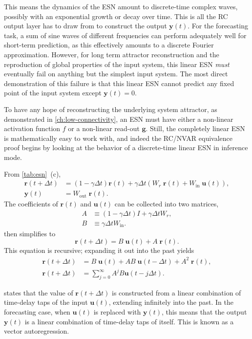 This means the dynamics of the ESN amount to discrete-time complex
waves, possibly with an exponential growth or decay over time. This is
all the RC output layer has to draw from to construct the output
$\bm{y}(t)$. For the forecasting task, a sum of sine waves of
different frequencies can perform adequately well for short-term
prediction, as this effectively amounts to a discrete Fourier
approximation. However, for long term attractor reconstruction and the
reproduction of global properties of the input system, this linear ESN
\emph{must} eventually fail on anything but the simplest input
system. The most direct demonstration of this failure is that this
linear ESN cannot predict any fixed point of the input system except
$\bm{y}(t) = 0$.

To have any hope of reconstructing the underlying system attractor, as
demonstrated in \cref{ch:low-connectivity}, an ESN must have either a
non-linear activation function $f$ or a non-linear read-out
$\bm{g}$. Still, the completely linear ESN is mathematically easy to
work with, and indeed the RC/NVAR equivalence proof begins by looking
at the behavior of a discrete-time linear ESN in inference mode.

From \cref{tab:esn}~(c),
\begin{align}
  \bm{r}(t + \Delta t) &= (1 - \gamma \Delta t) \bm{r}(t) + \gamma \Delta t \left( W_r\;\bm{r}(t) + W_\text{in}\;\bm{u}(t) \right), \label{eq:nvar-esn} \\
  \bm{y}(t) &= W_\text{out}\;\bm{r}(t).
\end{align}
The coefficients of $\bm{r}(t)$ and $\bm{u}(t)$ can be collected into two matrices,
\begin{align}
  A &\equiv (1 - \gamma \Delta t) I + \gamma \Delta t W_r, \\
  B &\equiv \gamma \Delta t W_\text{in}.
\end{align}
 then simplifies to
\begin{equation}
  \bm{r}(t + \Delta t) = B\;\bm{u}(t) + A\;\bm{r}(t).
\end{equation}
This equation is recursive; expanding it out into the past yields
\begin{align}
  \bm{r}(t + \Delta t) &= B\;\bm{u}(t) + AB\;\bm{u}(t - \Delta t) + A^2\;\bm{r}(t), \\
  \bm{r}(t + \Delta t) &= \sum_{j = 0}^\infty A^j B \bm{u}(t - j \Delta t). \label{eq:esn-var-mat}
\end{align}

 states that the value of $\bm{r}(t + \Delta t)$
is constructed from a linear combination of time-delay taps of the
input $\bm{u}(t)$, extending infinitely into the past. In the
forecasting case, when $\bm{u}(t)$ is replaced with $\bm{y}(t)$, this
means that the output $\bm{y}(t)$ is a linear combination of
time-delay taps of itself. This is known as a vector
autoregression.

